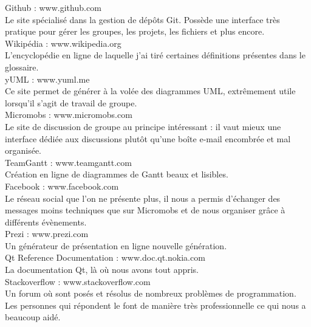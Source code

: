 \documentclass[a4paper, 12pt]{report}
\begin{document}
	\begin{thebibliography}{2}
		\label{sitographie}
		Github : www.github.com \\
		Le site spécialisé dans la gestion de dépôts \gls{Git}. Possède une interface très pratique pour gérer les groupes, les projets,
		les fichiers et plus encore.
		~\\
		Wikipédia : www.wikipedia.org \\
		L'encyclopédie en ligne de laquelle j'ai tiré certaines définitions présentes dans le glossaire.
		~\\
		yUML : www.yuml.me \\
		Ce site permet de générer à la volée des diagrammes \gls{UML}, extrêmement utile lorsqu'il s'agit de travail de groupe.
		~\\
		Micromobs : www.micromobs.com \\
		Le site de discussion de groupe au principe intéressant : il vaut mieux une interface dédiée aux discussions plutôt
		qu'une boîte e-mail encombrée et mal organisée.
		~\\
		TeamGantt : www.teamgantt.com \\
		Création en ligne de diagrammes de Gantt beaux et lisibles.
		~\\
		Facebook : www.facebook.com \\
		Le réseau social que l'on ne présente plus, il nous a permis d'échanger des messages moins techniques que sur Micromobs
		et de nous organiser grâce à différents évènements.
		~\\
		Prezi : www.prezi.com \\
		Un générateur de présentation en ligne nouvelle génération.
		~\\
		Qt Reference Documentation : www.doc.qt.nokia.com \\
		La documentation Qt, là où nous avons tout appris.	
		~\\
		Stackoverflow : www.stackoverflow.com \\
		Un forum où sont posés et résolus de nombreux problèmes de programmation. Les personnes qui répondent le font de manière
		très professionnelle ce qui nous a beaucoup aidé.
	\end{thebibliography}
\end{document}
